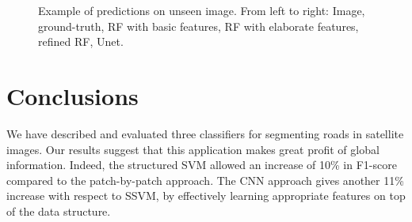\documentclass[10pt,conference,compsocconf]{IEEEtran}
\begin{document}
\begin{figure}
\caption{Example of predictions on unseen image. From left to right: Image,
  ground-truth, RF with basic features, RF with elaborate features, refined RF, Unet.}\label{example_all}
\end{figure}

\section{Conclusions}
We have described and evaluated three classifiers for segmenting roads in
satellite images. Our results suggest that this application makes great profit
of global information. Indeed, the structured SVM allowed an increase of
10\% in F1-score compared to the patch-by-patch approach. The CNN approach
gives another 11\% increase with respect to SSVM, by effectively learning
appropriate features on top of the data structure.
	
	
\end{document}
